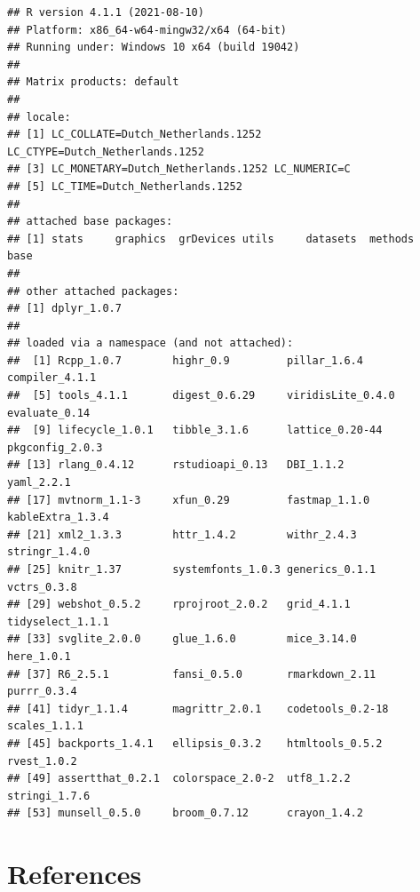 \documentclass[
]{article}
\begin{document}
\begin{verbatim}
## R version 4.1.1 (2021-08-10)
## Platform: x86_64-w64-mingw32/x64 (64-bit)
## Running under: Windows 10 x64 (build 19042)
## 
## Matrix products: default
## 
## locale:
## [1] LC_COLLATE=Dutch_Netherlands.1252  LC_CTYPE=Dutch_Netherlands.1252   
## [3] LC_MONETARY=Dutch_Netherlands.1252 LC_NUMERIC=C                      
## [5] LC_TIME=Dutch_Netherlands.1252    
## 
## attached base packages:
## [1] stats     graphics  grDevices utils     datasets  methods   base     
## 
## other attached packages:
## [1] dplyr_1.0.7
## 
## loaded via a namespace (and not attached):
##  [1] Rcpp_1.0.7        highr_0.9         pillar_1.6.4      compiler_4.1.1   
##  [5] tools_4.1.1       digest_0.6.29     viridisLite_0.4.0 evaluate_0.14    
##  [9] lifecycle_1.0.1   tibble_3.1.6      lattice_0.20-44   pkgconfig_2.0.3  
## [13] rlang_0.4.12      rstudioapi_0.13   DBI_1.1.2         yaml_2.2.1       
## [17] mvtnorm_1.1-3     xfun_0.29         fastmap_1.1.0     kableExtra_1.3.4 
## [21] xml2_1.3.3        httr_1.4.2        withr_2.4.3       stringr_1.4.0    
## [25] knitr_1.37        systemfonts_1.0.3 generics_0.1.1    vctrs_0.3.8      
## [29] webshot_0.5.2     rprojroot_2.0.2   grid_4.1.1        tidyselect_1.1.1 
## [33] svglite_2.0.0     glue_1.6.0        mice_3.14.0       here_1.0.1       
## [37] R6_2.5.1          fansi_0.5.0       rmarkdown_2.11    purrr_0.3.4      
## [41] tidyr_1.1.4       magrittr_2.0.1    codetools_0.2-18  scales_1.1.1     
## [45] backports_1.4.1   ellipsis_0.3.2    htmltools_0.5.2   rvest_1.0.2      
## [49] assertthat_0.2.1  colorspace_2.0-2  utf8_1.2.2        stringi_1.7.6    
## [53] munsell_0.5.0     broom_0.7.12      crayon_1.4.2
\end{verbatim}

\hypertarget{references}{%
\section*{References}\label{references}}
\end{document}
